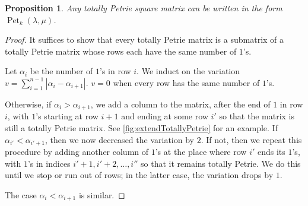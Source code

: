 \documentclass[pdflatex,sn-mathphys-num]{sn-jnl}%
\theoremstyle{thmstyleone}%
\newtheorem{proposition}[theorem]{Proposition}
\theoremstyle{thmstyletwo}%
\theoremstyle{thmstylethree}%
\numberwithin{equation}{section}
\DeclareMathOperator{\Pet}{Pet}
\begin{document}
        \begin{proposition}\label{prop:extendTotallyPetrie}
            Any totally Petrie square matrix can be written in the form $\Pet_k(\lambda,\mu)$.
        \end{proposition}
        \begin{proof}
            It suffices to show that every totally Petrie matrix is a submatrix of a totally Petrie matrix whose rows each have the same number of $1$'s.

            Let $\alpha_i$ be the number of $1$'s in row $i$. We induct on the variation $v=\sum_{i=1}^{n-1}|\alpha_i-\alpha_{i+1}|$. $v=0$ when every row has the same number of $1$'s.

            Otherwise, if $\alpha_i>\alpha_{i+1}$, we add a column to the matrix, after the end of $1$ in row $i$, with $1$'s starting at row $i+1$ and ending at some row $i'$ so that the matrix is still a totally Petrie matrix. See \cref{fig:extendTotallyPetrie} for an example. If $\alpha_{i'}<\alpha_{i'+1}$, then we now decreased the variation by $2$. If not, then we repeat this procedure by adding another column of $1$'s at the place where row $i'$ ends its $1$'s, with $1$'s in indices $i'+1,i'+2,\dotsc,i''$ so that it remains totally Petrie. We do this until we stop or run out of rows; in the latter case, the variation drops by $1$.
            
            The case $\alpha_i<\alpha_{i+1}$ is similar.
        \end{proof}
\end{document}
